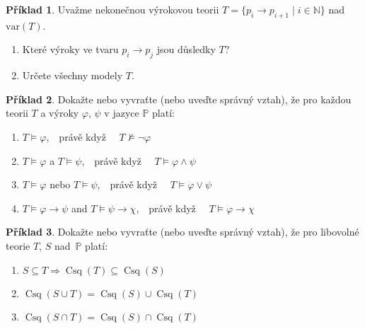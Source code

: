 \documentclass[a4paper]{article}
\theoremstyle{definition}
\newtheorem{problem}{Příklad}
\DeclareMathOperator{\Conseq}{Csq}
\begin{document}
    
\medskip\begin{problem}
Uvažme nekonečnou výrokovou teorii $T=\{p_i \to p_{i+1}\mid i\in \mathbb{N}\}$ nad $\mathrm{var}(T)$. 
\begin{enumerate}
    \item Které výroky ve tvaru  $p_i \to p_j$ jsou důsledky $T$?
    \item Určete všechny modely $T$.
\end{enumerate}
\end{problem}


\medskip\begin{problem}
Dokažte nebo vyvraťte (nebo uveďte správný vztah), že pro každou teorii $T$ a výroky $\varphi$, $\psi$ v jazyce $\mathbb{P}$ platí:
\begin{enumerate}
    \item $T \models \varphi$,\ \  právě když \ \ $T \not\models \neg \varphi$
    \item $T \models \varphi$ a $T \models \psi$,\ \ právě když \ \ $T \models \varphi \wedge \psi$
    \item $T \models \varphi$ nebo $T \models \psi$,\ \ právě když \ \ $T \models \varphi \vee \psi$
    \item $T \models \varphi \to \psi$ and $T \models \psi \to \chi$,\ \ právě když \ \ $T \models \varphi \to \chi$
\end{enumerate}
\end{problem}
    

\medskip\begin{problem}
Dokažte nebo vyvraťte (nebo uveďte správný vztah), že pro libovolné teorie $T$, $S$ nad~$\mathbb{P}$ platí:
\begin{enumerate}
    \item $S\subseteq T \Rightarrow \Conseq(T) \subseteq \Conseq(S)$
    \item $\Conseq(S\cup T)=\Conseq(S) \cup \Conseq(T)$
    \item $\Conseq(S\cap T)=\Conseq(S) \cap \Conseq(T)$
\end{enumerate}
\end{problem}
\end{document}
